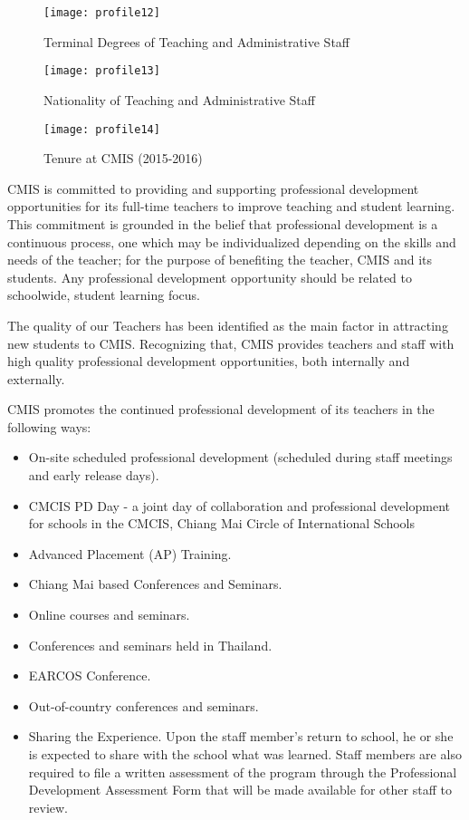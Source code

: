 \begin{figure}
\centering
\texttt{[image: profile12]}
\caption{Terminal Degrees of Teaching and Administrative Staff}
\end{figure}

\begin{figure}
\centering
\texttt{[image: profile13]}
\caption{Nationality of Teaching and Administrative Staff}
\end{figure}

\begin{figure}
\centering
\texttt{[image: profile14]}
\caption{Tenure at CMIS (2015-2016)}
\end{figure}


CMIS is committed to providing and supporting professional development opportunities for its full-time teachers to improve teaching and student learning. This commitment is grounded in the belief that professional development is a continuous process, one which may be individualized depending on the skills and needs of the teacher; for the purpose of benefiting the teacher, CMIS and its students.  Any professional development opportunity should be related to schoolwide, student learning focus. 

The quality of our Teachers has been identified as the main factor in attracting new students to CMIS.  Recognizing that, CMIS provides teachers and staff with high quality professional development opportunities, both internally and externally.  

CMIS promotes the continued professional development of its teachers in the following ways:

\begin{itemize}
\item On-site scheduled professional development (scheduled during staff meetings and early release days).
\item CMCIS  PD Day - a joint day of collaboration and professional development for schools in the CMCIS, Chiang Mai Circle of International Schools
\item Advanced Placement (AP) Training.  
\item Chiang Mai based Conferences and Seminars. 
\item Online courses and seminars.  
\item Conferences and seminars held in Thailand. 
\item EARCOS Conference.
\item  Out-of-country conferences and seminars. 
\item Sharing the Experience.  Upon the staff member’s return to school, he or she is expected to share with the school what was learned.  Staff members are also required to file a written assessment of the program through the Professional Development Assessment Form that will be made available for other staff to review.
\end{itemize}


